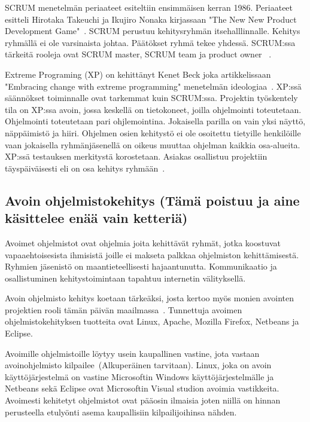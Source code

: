 \documentclass[finnish]{tktltiki2}
\theoremstyle{definition}
\theoremstyle{remark}
\begin{document}
 SCRUM menetelmän periaateet esiteltiin ensimmäisen kerran 1986. Periaateet esitteli Hirotaka Takeuchi ja Ikujiro Nonaka kirjassaan "The New New Product Development Game"~\cite{nonaka1986new}. SCRUM perustuu kehitysryhmän itsehalllinnalle. Kehitys ryhmällä ei ole varsinaista johtaa. Päätökset ryhmä tekee yhdessä. SCRUM:ssa tärkeitä rooleja ovat SCRUM master, SCRUM team ja product owner ~\cite{schwaber2002agile}. 

Extreme Programing (XP) on kehittänyt Kenet Beck joka artikkelissaan "Embracing change with extreme programming" menetelmän ideologiaa~\cite{796139}. XP:ssä säännökset toiminnalle ovat tarkemmat kuin SCRUM:ssa. Projektin työskentely tila on XP:ssa avoin, jossa keskellä on tietokoneet, joilla ohjelmointi toteutetaan. Ohjelmointi toteutetaan pari ohjlemointina. Jokaisella parilla on vain yksi näyttö, näppäimistö ja hiiri. Ohjelmen osien kehitystö ei ole osoitettu tietyille henkilöille vaan jokaisella ryhmänjäsenellä on oikeus muuttaa ohjelman kaikkia osa-alueita. XP:ssä testauksen merkitystä korostetaan. Asiakas osallistuu projektiin täyspäiväisesti eli on osa kehitys ryhmään~\cite{796139}.  



\subsection{Avoin ohjelmistokehitys (Tämä poistuu ja aine käsittelee enää vain ketteriä)}

Avoimet ohjelmistot ovat ohjelmia joita kehittävät ryhmät, jotka koostuvat vapaaehtoisesista ihmisistä joille ei makseta palkkaa ohjelmiston kehittämisestä. Ryhmien jäsenistö on maantieteellisesti hajaantunutta. Kommunikaatio ja osallistuminen kehitystoimintaan tapahtuu internetin välityksellä.

Avoin ohjelmisto kehitys koetaan tärkeäksi, josta kertoo myös monien avointen projektien rooli tämän päivän maailmassa~\cite{Li:2006:MOS:1125170.1125182}. Tunnettuja avoimen ohjelmistokehityksen tuotteita ovat Linux, Apache, Mozilla Firefox, Netbeans ja Eclipse. 

Avoimille ohjelmistoille löytyy usein kaupallinen vastine, jota vastaan avoinohjelmisto kilpailee~\cite{Luther:2008:LOC:1460563.1460619}(Alkuperäinen tarvitaan). Linux, joka on avoin käyttöjärjestelmä on vastine Microsoftin Windows käyttöjärjestelmälle ja Netbeans sekä Eclipse ovat Microsoftin Visual studion avoimia vastikkeita. Avoimesti kehitetyt ohjelmistot ovat pääosin ilmaisia joten niillä on hinnan perusteella etulyönti asema kaupallisiin kilpailijoihinsa nähden. 
\end{document}
